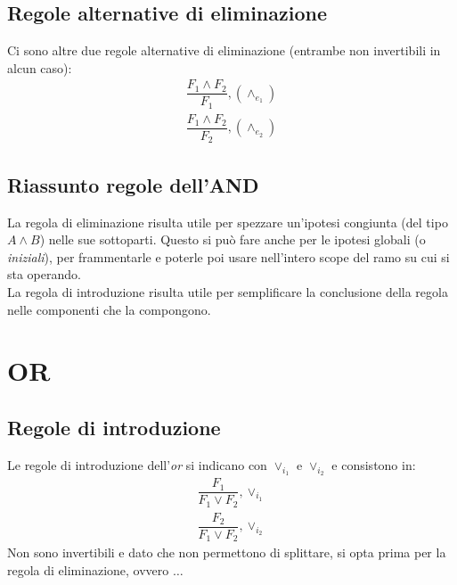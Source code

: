 \documentclass[12pt]{article}
\begin{document}
\subsection{Regole alternative di eliminazione}
Ci sono altre due regole alternative di eliminazione (entrambe non invertibili in alcun caso):
\begin{gather}
    \dfrac{F_1 \wedge F_2}{F_1}, (\wedge_{e_1}) \label{rule:and_elim_1}\\
    \dfrac{F_1 \wedge F_2}{F_2}, (\wedge_{e_2}) \label{rule:and_elim_2}
\end{gather}
\subsection{Riassunto regole dell'AND}
La regola di eliminazione risulta utile per spezzare un'ipotesi congiunta (del tipo $A \wedge B$) nelle sue sottoparti. Questo si può fare anche per le ipotesi globali (o \textit{iniziali}), per frammentarle e poterle poi usare nell'intero scope del ramo su cui si sta operando.\\
La regola di introduzione risulta utile per semplificare la conclusione della regola nelle componenti che la compongono.
\pagebreak
\section{OR}
\subsection{Regole di introduzione}
Le regole di introduzione dell'\textit{or} si indicano con $\vee_{i_1}$ e $\vee_{i_2}$ e consistono in:
\begin{gather}
    \dfrac{F_1}{F_1 \vee F_2},\vee_{i_1}  \label{rule:or_intro_1}\\
    \dfrac{F_2}{F_1 \vee F_2},\vee_{i_2}  \label{rule:or_intro_2}
\end{gather}
Non sono invertibili e dato che non permettono di splittare, si opta prima per la regola di eliminazione, ovvero $\dots$
\end{document}
